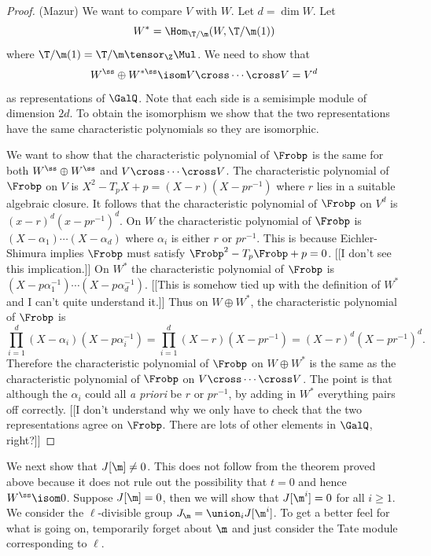 \documentclass{report}
\begin{document}
\begin{proof} (Mazur)
We want to compare $V$ with $W$. Let $d=\dim W$. Let
$$W^*=\Hom_{\T/\m}(W,\T/\m(1))$$
where $\T/\m(1)=\T/\m\tensor_{\Z}\Mul$.
We need to show that
$$W^{\ss}\oplus W^{*\ss}\isom V\cross\cdots\cross V=V^{d}$$
as representations of $\GalQ$.
Note that each side is a semisimple module of dimension $2d$.
To obtain the isomorphism we show that the two representations
have the same characteristic polynomials so they are isomorphic.

We want to show that the characteristic polynomial of $\Frobp$
is the same for both $W^{\ss}\oplus W^{\*\ss}$ and $V\cross\cdots\cross V$.
The characteristic polynomial of $\Frobp$ on $V$ is
$X^2-T_pX+p=(X-r)(X-pr^{-1})$ where $r$ lies in a suitable
algebraic closure. It follows that the characteristic
polynomial of $\Frobp$ on $V^d$ is $(x-r)^d(x-pr^{-1})^d$.
On $W$ the characteristic polynomial of $\Frobp$ is
$(X-\alpha_1)\cdots(X-\alpha_d)$ where
$\alpha_i$ is either $r$ or $pr^{-1}$. This is because Eichler-Shimura
implies $\Frobp$ must satisfy $\Frobp^2-T_p\Frobp+p=0$.
[[I don't see this implication.]]
On $W^{*}$ the characteristic polynomial of $\Frobp$ is
$(X-p\alpha_1^{-1})\cdots(X-p\alpha_d^{-1})$. [[This is
somehow tied up with the definition of $W^{*}$ and I can't
quite understand it.]] Thus on $W\oplus W^{*}$, the
characteristic polynomial of $\Frobp$ is
$$\prod_{i=1}^{d}(X-\alpha_i)(X-p\alpha_i^{-1})=
             \prod_{i=1}^d(X-r)(X-pr^{-1})=(X-r)^d(X-pr^{-1})^d.$$
Therefore the characteristic polynomial of $\Frobp$ on $W\oplus W^{*}$
is the same as the characteristic polynomial of $\Frobp$ on
$V\cross\cdots\cross V$.
The point is that although the $\alpha_i$ could all {\em a priori} be
$r$ or $pr^{-1}$, by adding in $W^*$ everything pairs off correctly.
[[I don't understand why we only have to check that the two representations
agree on $\Frobp$. There are lots of other elements in $\GalQ$, right?]]
\end{proof}

We next show that $J[\m]\neq 0$. This does not follow from the
theorem proved above because it does not rule out the possibility
that $t=0$ and hence $W^{\ss}\isom 0$.
Suppose $J[\m]=0$, then we will show that $J[\m^i]=0$ for all $i\geq 1$.
We consider the $\ell$-divisible
group $J_{\m}=\union_i J[\m^i]$. To get a better feel for what is going
on, temporarily forget about
$\m$ and just consider the Tate module corresponding to $\ell$.
\end{document}
